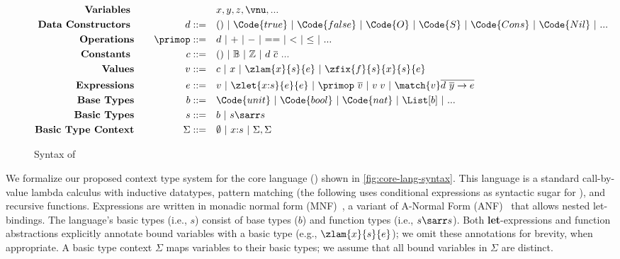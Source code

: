 \begin{figure}[h]
  {\small
    \begin{alignat*}{2}
      \text{\textbf{Variables }}& \quad &\quad& x, y, z, \vnu, ...
      \\\text{\textbf{Data Constructors }}& \quad &d ::= \quad & () ~|~ \Code{true} ~|~ \Code{false} ~|~ \Code{O} ~|~ \Code{S} ~|~ \Code{Cons} ~|~ \Code{Nil} ~|~ ...
      \\\text{\textbf{Operations}}& \quad & \primop ::= \quad & d ~|~ {+} ~|~ {-} ~|~ {==} ~|~ {<} ~|~ {\leq} ~|~ ...
      \\ \text{\textbf{Constants }}& \quad &c ::= \quad & () ~|~ \mathbb{B} ~|~ \mathbb{Z} ~|~ d\ \overline{c}\ ...
      \\ \text{\textbf{Values}}& \quad  & v ::= \quad & c ~|~ x ~|~ \zlam{x}{s}{e} ~|~ \zfix{f}{s}{x}{s}{e}
      \\ \text{\textbf{Expressions}}& \quad & e ::=\quad & v ~|~ \zlet{x{:}s}{e}{e} ~|~ \primop\ \overline{v} ~|~  v\;v ~|~ \match{v} \overline{d\ \overline{y} \to e}
      \\\text{\textbf{Base Types}}& \quad & b  ::= \quad &  \Code{unit} ~|~ \Code{bool} ~|~ \Code{nat} ~|~ \List[b] ~|~ ...
      \\\text{\textbf{Basic Types}}& \quad & s  ::= \quad &  b ~|~ s\sarr s
      \\\text{\textbf{Basic Type Context}}& \quad & \Sigma ::= \quad &  \emptyset ~|~ x{:}s ~|~ \Sigma, \Sigma
    \end{alignat*}}
  \caption{Syntax of \langname{} }
  \label{fig:core-lang-syntax}
  \end{figure}

  We formalize our proposed context type system for the core language
  (\langname{}) shown in \autoref{fig:core-lang-syntax}.  This
  language is a standard call-by-value lambda calculus with inductive
  datatypes, pattern matching (the following uses conditional
  expressions as syntactic sugar for ), and recursive
  functions.   Expressions are written in
  monadic normal form (MNF)~\cite{JO94}, a variant of A-Normal Form
  (ANF)~\cite{FSDF93} that allows nested let-bindings.  The language's
  basic types (i.e., $s$) consist of base types ($b$) and function
  types (i.e., $s\sarr s$). Both \textbf{let}-expressions and function
  abstractions explicitly annotate bound variables with a basic type
  (e.g., $\zlam{x}{s}{e}$); we omit these annotations for brevity,
  when appropriate.  A basic type context $\Sigma$ maps variables to
  their basic types; we assume that all bound variables in $\Sigma$
  are distinct.

